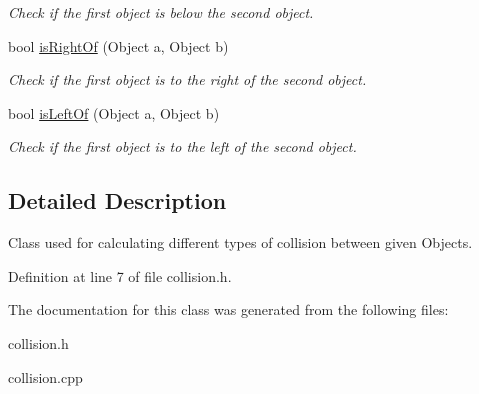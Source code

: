 \begin{DoxyCompactItemize}
\begin{DoxyCompactList}\small\item\em Check if the first object is below the second object. \end{DoxyCompactList}\item 
bool \hyperlink{classCollision_a9330290516beca87905e81a974ffca83}{is\+Right\+Of} (Object a, Object b)\hypertarget{classCollision_a9330290516beca87905e81a974ffca83}{}\label{classCollision_a9330290516beca87905e81a974ffca83}

\begin{DoxyCompactList}\small\item\em Check if the first object is to the right of the second object. \end{DoxyCompactList}\item 
bool \hyperlink{classCollision_aea67f8b0cd9b37408e2f6f65006b27d3}{is\+Left\+Of} (Object a, Object b)\hypertarget{classCollision_aea67f8b0cd9b37408e2f6f65006b27d3}{}\label{classCollision_aea67f8b0cd9b37408e2f6f65006b27d3}

\begin{DoxyCompactList}\small\item\em Check if the first object is to the left of the second object. \end{DoxyCompactList}\end{DoxyCompactItemize}


\subsection{Detailed Description}
Class used for calculating different types of collision between given Objects. 

Definition at line 7 of file collision.\+h.



The documentation for this class was generated from the following files\+:\begin{DoxyCompactItemize}
\item 
collision.\+h\item 
collision.\+cpp\end{DoxyCompactItemize}
